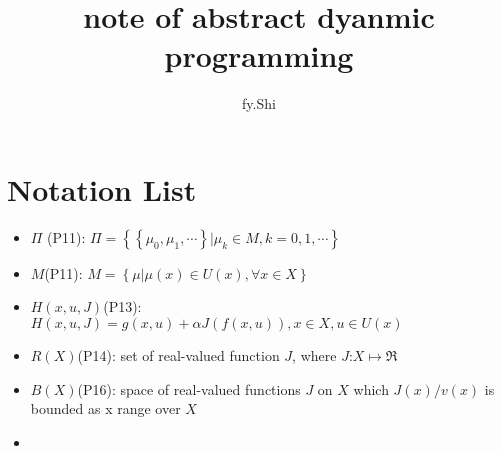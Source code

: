 \documentclass{article}
\title{note of abstract dyanmic programming}
\author{fy.Shi}
\date{}
\begin{document}
\maketitle

\section{Notation List}
\begin{itemize}
	\item $\Pi$ (P11): $\Pi = \left\{ \left\{ \mu_{0}, \mu_{1}, \cdots \right\} | \mu_{k}  \in M, k = 0, 1, \cdots \right\}$
	\item $M$(P11): $M=\left\{ \mu | \mu(x) \in U(x), \forall x \in X \right\}$
	\item $H(x,u,J)$(P13): $H(x,u,J)=g(x,u)+ \alpha J(f(x,u)), x \in X, u \in U(x)$
	\item $R(X)$(P14): set of real-valued function $J$, where $J$:$X \mapsto \Re$
	\item $B(X)$(P16): space of real-valued functions $J$ on $X$ which $J(x)/v(x)$ is bounded as x range over $X$
	\item 
\end{itemize}





\end{document}
